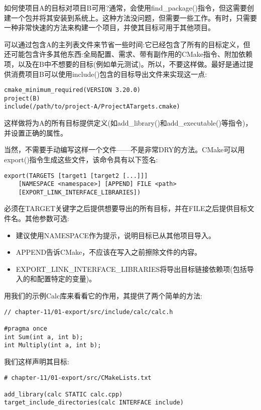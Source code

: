 如何使项目A的目标对项目B可用?通常，会使用find\_package()指令，但这需要创建一个包并将其安装到系统上。这种方法没问题，但需要一些工作。有时，只需要一种非常快速的方法来构建一个项目，并使其目标可用于其他项目。

可以通过包含A的主列表文件来节省一些时间:它已经包含了所有的目标定义，但还可能包含许多其他东西:全局配置、需求、带有副作用的CMake指令、附加依赖项，以及在B中不想要的目标(例如单元测试)。所以，不要这样做。最好是通过提供消费项目B可以使用include()包含的目标导出文件来实现这一点:

\begin{lstlisting}[style=styleCMake]
cmake_minimum_required(VERSION 3.20.0)
project(B)
include(/path/to/project-A/ProjectATargets.cmake)
\end{lstlisting}

这样做将为A的所有目标提供定义(如add\_library()和add\_executable()等指令)，并设置正确的属性。

当然，不需要手动编写这样一个文件——不是非常DRY的方法。CMake可以用export()指令生成这些文件，该命令具有以下签名:

\begin{lstlisting}[style=styleCMake]
export(TARGETS [target1 [target2 [...]]]
	[NAMESPACE <namespace>] [APPEND] FILE <path>
	[EXPORT_LINK_INTERFACE_LIBRARIES])
\end{lstlisting}

必须在TARGET关键字之后提供想要导出的所有目标，并在FILE之后提供目标文件名。其他参数可选:

\begin{itemize}
\item 
建议使用NAMESPACE作为提示，说明目标已从其他项目导入。

\item 
APPEND告诉CMake，不应该在写入之前擦除文件的内容。

\item 
EXPORT\_LINK\_INTERFACE\_LIBRARIES将导出目标链接依赖项(包括导入的和配置特定的变量)。
\end{itemize}

用我们的示例Calc库来看看它的作用，其提供了两个简单的方法:

\begin{lstlisting}[style=styleCXX]
// chapter-11/01-export/src/include/calc/calc.h

#pragma once
int Sum(int a, int b);
int Multiply(int a, int b);
\end{lstlisting}

我们这样声明其目标:

\begin{lstlisting}[style=styleCMake]
# chapter-11/01-export/src/CMakeLists.txt

add_library(calc STATIC calc.cpp)
target_include_directories(calc INTERFACE include)
\end{lstlisting}

